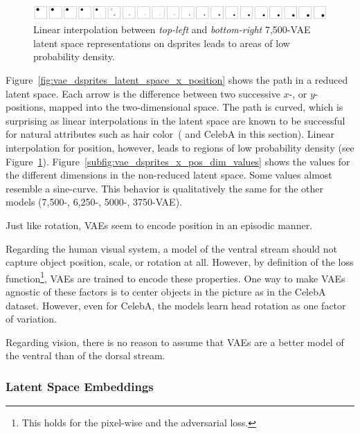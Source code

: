 \begin{figure}
    \centering
    \includegraphics[width=\textwidth]{images/latent_space_traversals/vae_dsprites_7500_position.png}
    \caption{Linear interpolation between \textit{top-left} and \textit{bottom-right} 7,500-\ac{VAE} latent space representations on dsprites leads to areas of low probability density.}
    \label{fig:vae_7500_dsprites_position_interpolation}
\end{figure}

Figure~\ref{fig:vae_dsprites_latent_space_x_position} shows the path in a reduced latent space.
Each arrow is the difference between two successive $x$-, or $y$-positions, mapped into the two-dimensional space.
The path is curved, which is surprising as linear interpolations in the latent space are known to be successful for natural attributes such as hair color~(\citep{radford2016deep} and CelebA in this section).
Linear interpolation for position, however, leads to regions of low probability density (see Figure~\ref{fig:vae_7500_dsprites_position_interpolation}).
Figure~\ref{subfig:vae_dsprites_x_pos_dim_values} shows the values for the different dimensions in the non-reduced latent space.
Some values almost resemble a sine-curve.
This behavior is qualitatively the same for the other models (7,500-, 6,250-, 5000-, 3750-\ac{VAE}).

Just like rotation, \acp{VAE} seem to encode position in an episodic manner.

Regarding the human visual system, a model of the ventral stream should not capture object position, scale, or rotation at all.
However, by definition of the loss function\footnote{This holds for the pixel-wise and the adversarial loss.}, \acp{VAE} are trained to encode these properties.
One way to make \acp{VAE} agnostic of these factors is to center objects in the picture as in the CelebA dataset.
However, even for CelebA, the models learn head rotation as one factor of variation.

Regarding vision, there is no reason to assume that \acp{VAE} are a better model of the ventral than of the dorsal stream.

\subsubsection{Latent Space Embeddings}\label{subsubsec:latent_space_embeddings}

